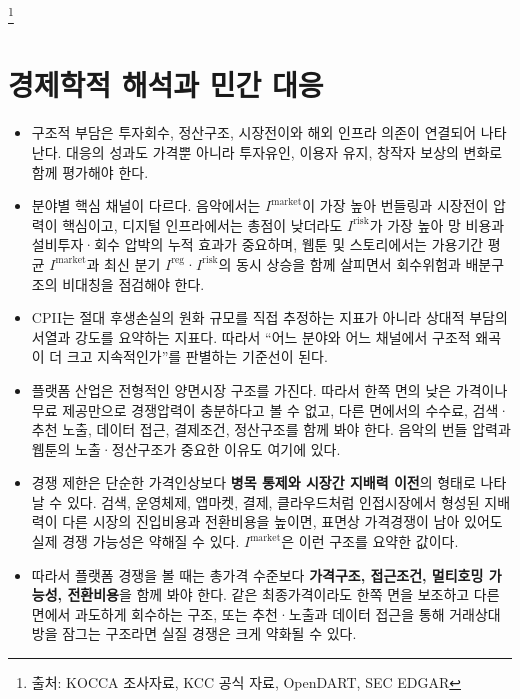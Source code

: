 \documentclass[11pt,a4paper]{report}
\newcommand{\sourcefootnote}[1]{\footnote{출처: #1}}
\begin{document}
\sourcefootnote{KOCCA 조사자료, KCC 공식 자료, OpenDART, SEC EDGAR}

\section{경제학적 해석과 민간 대응}
\begin{itemize}[leftmargin=1.8em,itemsep=0.35em]
  \item 구조적 부담은 투자회수, 정산구조, 시장전이와 해외 인프라 의존이 연결되어 나타난다. 대응의 성과도 가격뿐 아니라 투자유인, 이용자 유지, 창작자 보상의 변화로 함께 평가해야 한다.
  \item 분야별 핵심 채널이 다르다. 음악에서는 \(I^{\mathrm{market}}\)이 가장 높아 번들링과 시장전이 압력이 핵심이고, 디지털 인프라에서는 총점이 낮더라도 \(I^{\mathrm{risk}}\)가 가장 높아 망 비용과 설비투자·회수 압박의 누적 효과가 중요하며, 웹툰 및 스토리에서는 가용기간 평균 \(I^{\mathrm{market}}\)과 최신 분기 \(I^{\mathrm{reg}}\)·\(I^{\mathrm{risk}}\)의 동시 상승을 함께 살피면서 회수위험과 배분구조의 비대칭을 점검해야 한다.
  \item CPII는 절대 후생손실의 원화 규모를 직접 추정하는 지표가 아니라 상대적 부담의 서열과 강도를 요약하는 지표다. 따라서 ``어느 분야와 어느 채널에서 구조적 왜곡이 더 크고 지속적인가''를 판별하는 기준선이 된다.
  \item 플랫폼 산업은 전형적인 양면시장 구조를 가진다. 따라서 한쪽 면의 낮은 가격이나 무료 제공만으로 경쟁압력이 충분하다고 볼 수 없고, 다른 면에서의 수수료, 검색·추천 노출, 데이터 접근, 결제조건, 정산구조를 함께 봐야 한다. 음악의 번들 압력과 웹툰의 노출·정산구조가 중요한 이유도 여기에 있다.
  \item 경쟁 제한은 단순한 가격인상보다 \textbf{병목 통제와 시장간 지배력 이전}의 형태로 나타날 수 있다. 검색, 운영체제, 앱마켓, 결제, 클라우드처럼 인접시장에서 형성된 지배력이 다른 시장의 진입비용과 전환비용을 높이면, 표면상 가격경쟁이 남아 있어도 실제 경쟁 가능성은 약해질 수 있다. \(I^{\mathrm{market}}\)은 이런 구조를 요약한 값이다.
  \item 따라서 플랫폼 경쟁을 볼 때는 총가격 수준보다 \textbf{가격구조, 접근조건, 멀티호밍 가능성, 전환비용}을 함께 봐야 한다. 같은 최종가격이라도 한쪽 면을 보조하고 다른 면에서 과도하게 회수하는 구조, 또는 추천·노출과 데이터 접근을 통해 거래상대방을 잠그는 구조라면 실질 경쟁은 크게 약화될 수 있다.
\end{itemize}
\end{document}
